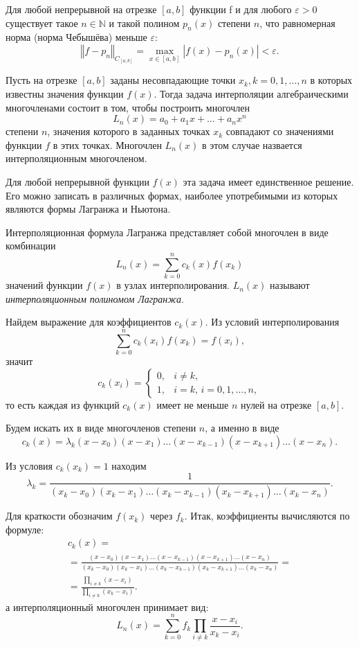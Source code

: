 \begin{thm}
  Для любой непрерывной на отрезке $[a,b]$ функции f и для любого
  $\varepsilon>0$ существует такое $n\in\mathbb{N}$ и такой полином
  $p_{n}(x)$ степени $n$, что равномерная норма (норма Чебышёва)
  меньше $\varepsilon$:
\[
\left\Vert f-p_{n}\right\Vert
_{C_{[a,b]}}=\max_{x\in[a,b]}|f(x)-p_{n}(x)|<\varepsilon.
\]

\end{thm}
Пусть на отрезке $[a,b]$ заданы несовпадающие точки
$x_{k},k=0,1,\dots,n$ в которых известны значения функции
$f(x)$. Тогда задача интерполяции алгебраическими многочленами состоит
в том, чтобы построить многочлен
\[
L_{n}(x)=a_{0}+a_{1}x+\dots+a_{n}x^{n}
\]
степени $n$, значения которого в заданных точках $x_{k}$ совпадают со
значениями функции $f$ в этих точках. Многочлен $L_{n}(x)$ в этом
случае назвается интерполяционным многочленом.

Для любой непрерывной функции $f(x)$ эта задача имеет единственное
решение. Его можно записать в различных формах, наиболее употребимыми
из которых являются формы Лагранжа и Ньютона.

Интерполяционная формула Лагранжа представляет собой многочлен в виде
комбинации
\[
L_{n}(x)=\sum_{k=0}^{n}c_{k}(x)f(x_{k})
\]
значений функции $f(x)$ в узлах интерполирования. $L_{n}(x)$ называют
\emph{интерполяционным полиномом Лагранжа}.

Найдем выражение для коэффициентов $c_{k}(x)$. Из условий
интерполирования
\[
\sum_{k=0}^{n}c_{k}(x_{i})f(x_{k})=f(x_{i}),
\]
значит
\[
c_{k}(x_{i})=\begin{cases} 0, & i\neq k,\\ 1, & i=k,\, i=0,1,\dots,n,
\end{cases}
\]
то есть каждая из функций $c_{k}(x)$ имеет не меньше $n$ нулей на
отрезке $[a,b]$.

Будем искать их в виде многочленов степени $n$, а именно в виде
\[
c_{k}(x)=\lambda_{k}(x-x_{0})(x-x_{1})\dots(x-x_{k-1})(x-x_{k+1})\dots(x-x_{n}).
\]


Из условия $c_{k}(x_{k})=1$ находим
\[
\lambda_{k}=\frac{1}{(x_{k}-x_{0})(x_{k}-x_{1})\dots(x_{k}-x_{k-1})(x_{k}-x_{k+1})\dots(x_{k}-x_{n})}.
\]


Для краткости обозначим $f(x_{k})$ через $f_{k}$. Итак, коэффициенты
вычисляются по формуле:
\begin{multline*}
c_{k}(x)=\\ =\frac{(x-x_{0})(x-x_{1})\dots(x-x_{k-1})(x-x_{k+1})\dots(x-x_{n})}{(x_{k}-x_{0})(x_{k}-x_{1})\dots(x_{k}-x_{k-1})(x_{k}-x_{k+1})\dots(x_{k}-x_{n})}=\\ =\frac{\prod_{i\neq
    k}(x-x_{i})}{\prod_{i\neq k}(x_{k}-x_{i})}.
\end{multline*}
а интерполяционный многочлен принимает вид:
\[
L_{n}(x)=\sum_{k=0}^{n}f_{k}\prod_{i\neq k}\frac{x-x_{i}}{x_{k}-x_{i}}.
\]


